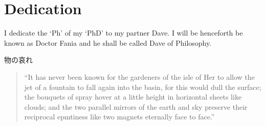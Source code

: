 
\pagestyle{empty}

\chapter{Dedication}





I dedicate the `Ph' of my `PhD' to my partner Dave. I will be henceforth be known as Doctor Fania and he shall be called Dave of Philosophy.

\begin{CJK}{UTF8}{min}
  物の哀れ
\end{CJK}

\begin{quote}
  ``It has never been known for the gardeners of the isle of Her to allow the jet of a fountain to fall again into the basin, for this would dull the surface; the bouquets of spray hover at a little height in horizontal sheets like clouds; and the two parallel mirrors of the earth and sky preserve their reciprocal epmtiness like two magnets eternally face to face.'' \citep[p.49]{Jarry1997}
\end{quote}

\clearpage
